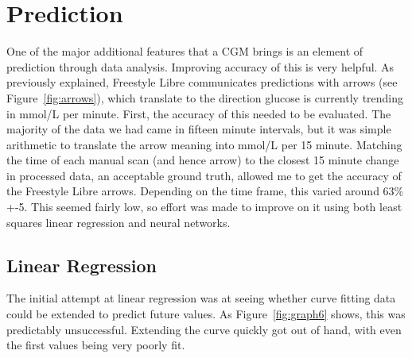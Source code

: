 \section{Prediction}
One of the major additional features that a CGM brings is an element of prediction through data analysis. Improving accuracy of this is very helpful. As previously explained, Freestyle Libre communicates predictions with arrows (see Figure~\ref{fig:arrows}), which translate to the direction glucose is currently trending in mmol/L per minute. First, the accuracy of this needed to be evaluated. The majority of the data we had came in fifteen minute intervals, but it was simple arithmetic to translate the arrow meaning into mmol/L per 15 minute. Matching the time of each manual scan (and hence arrow) to the closest 15 minute change in processed data, an acceptable ground truth, allowed me to get the accuracy of the Freestyle Libre arrows. Depending on the time frame, this varied around 63\% +-5. This seemed fairly low, so effort was made to improve on it using both least squares linear regression and neural networks.

\subsection{Linear Regression}
The initial attempt at linear regression was at seeing whether curve fitting data could be extended to predict future values. As Figure~\ref{fig:graph6} shows, this was predictably unsuccessful. Extending the curve quickly got out of hand, with even the first values being very poorly fit. 

